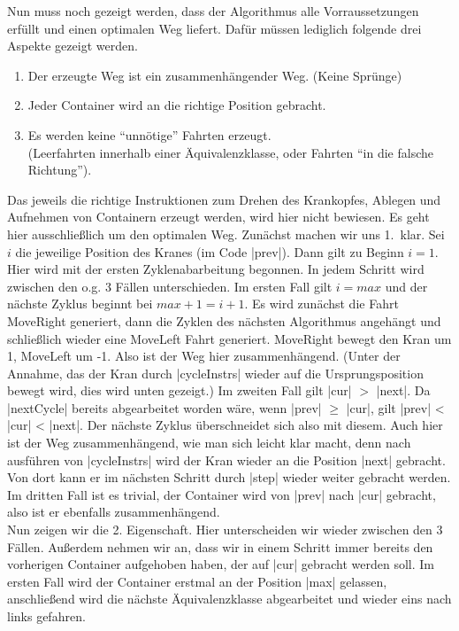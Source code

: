 Nun muss noch gezeigt werden, dass der Algorithmus alle Vorraussetzungen erfüllt und einen optimalen Weg liefert.
Dafür müssen lediglich folgende drei Aspekte gezeigt werden.
\begin{enumerate}
 \item Der erzeugte Weg ist ein zusammenhängender Weg. (Keine Sprünge)
 \item Jeder Container wird an die richtige Position gebracht.
 \item Es werden keine ``unnötige'' Fahrten erzeugt. \\
       (Leerfahrten innerhalb einer Äquivalenzklasse, oder Fahrten ``in die falsche Richtung'').
\end{enumerate}
Das jeweils die richtige Instruktionen zum Drehen des Krankopfes, Ablegen und Aufnehmen von Containern erzeugt werden, wird hier nicht bewiesen.
Es geht hier ausschließlich um den optimalen Weg. Zunächst machen wir uns 1.\ klar. Sei $i$ die jeweilige Position des Kranes (im Code |prev|).
Dann gilt zu Beginn $i = 1$. Hier wird mit der ersten Zyklenabarbeitung begonnen. In jedem Schritt wird zwischen den o.g. 3 Fällen unterschieden.
Im ersten Fall gilt $i=max$ und der nächste Zyklus beginnt bei $max+1=i+1$.
Es wird zunächst die Fahrt MoveRight generiert, dann die Zyklen des nächsten Algorithmus angehängt und schließlich wieder eine MoveLeft Fahrt generiert.
MoveRight bewegt den Kran um 1, MoveLeft um -1. Also ist der Weg hier zusammenhängend.
(Unter der Annahme, das der Kran durch |cycleInstrs| wieder auf die Ursprungsposition bewegt wird, dies wird unten gezeigt.)
Im zweiten Fall gilt |cur| $>$ |next|. Da |nextCycle| bereits abgearbeitet worden wäre, wenn |prev| $\geq$ |cur|, gilt |prev| < |cur| < |next|.
Der nächste Zyklus überschneidet sich also mit diesem.
Auch hier ist der Weg zusammenhängend, wie man sich leicht klar macht, denn nach ausführen von |cycleInstrs| wird der Kran wieder an die Position |next| gebracht.
Von dort kann er im nächsten Schritt durch |step| wieder weiter gebracht werden.
Im dritten Fall ist es trivial, der Container wird von |prev| nach |cur| gebracht, also ist er ebenfalls zusammenhängend.\\
Nun zeigen wir die 2. Eigenschaft. Hier unterscheiden wir wieder zwischen den 3 Fällen.
Außerdem nehmen wir an, dass wir in einem Schritt immer bereits den vorherigen Container aufgehoben haben, der auf |cur| gebracht werden soll.
Im ersten Fall wird der Container erstmal an der Position |max| gelassen, anschließend wird die nächste Äquivalenzklasse abgearbeitet und wieder eins nach links gefahren.
